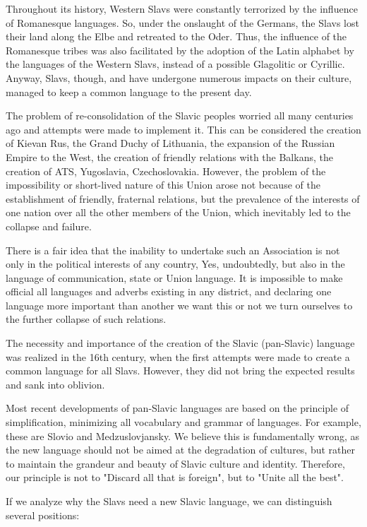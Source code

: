 Throughout its history, Western Slavs were constantly terrorized by the influence of Romanesque languages. So, under the onslaught of the Germans, the Slavs lost their land along the Elbe and retreated to the Oder. Thus, the influence of the Romanesque tribes was also facilitated by the adoption of the Latin alphabet by the languages of the Western Slavs, instead of a possible Glagolitic or Cyrillic. Anyway, Slavs, though, and have undergone numerous impacts on their culture, managed to keep a common language to the present day.

The problem of re-consolidation of the Slavic peoples worried all many centuries ago and attempts were made to implement it. This can be considered the creation of Kievan Rus, the Grand Duchy of Lithuania, the expansion of the Russian Empire to the West, the creation of friendly relations with the Balkans, the creation of ATS, Yugoslavia, Czechoslovakia. However, the problem of the impossibility or short-lived nature of this Union arose not because of the establishment of friendly, fraternal relations, but the prevalence of the interests of one nation over all the other members of the Union, which inevitably led to the collapse and failure.

There is a fair idea that the inability to undertake such an Association is not only in the political interests of any country, Yes, undoubtedly, but also in the language of communication, state or Union language. It is impossible to make official all languages and adverbs existing in any district, and declaring one language more important than another we want this or not we turn ourselves to the further collapse of such relations.

The necessity and importance of the creation of the Slavic (pan-Slavic) language was realized in the 16th century, when the first attempts were made to create a common language for all Slavs. However, they did not bring the expected results and sank into oblivion.

Most recent developments of pan-Slavic languages are based on the principle of simplification, minimizing all vocabulary and grammar of languages. For example, these are Slovio and Medzuslovjansky. We believe this is fundamentally wrong, as the new language should not be aimed at the degradation of cultures, but rather to maintain the grandeur and beauty of Slavic culture and identity. Therefore, our principle is not to "Discard all that is foreign", but to "Unite all the best".

If we analyze why the Slavs need a new Slavic language, we can distinguish several positions:

